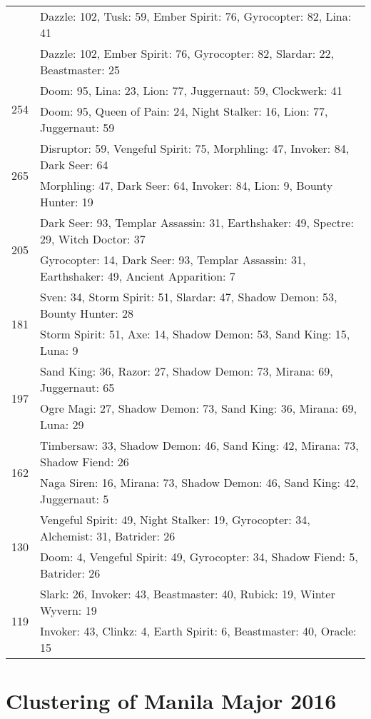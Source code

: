 \documentclass[result.tex]{subfiles}
\begin{document}
\begin{table}[H]
\begin{tabular}{ | c | p{12.5cm} | }
& Dazzle: 102, Tusk: 59, Ember Spirit: 76, Gyrocopter: 82, Lina: 41 \\
& Dazzle: 102, Ember Spirit: 76, Gyrocopter: 82, Slardar: 22, Beastmaster: 25 \\
\hline
\multirow{2}{*}{254}
& Doom: 95, Lina: 23, Lion: 77, Juggernaut: 59, Clockwerk: 41 \\
& Doom: 95, Queen of Pain: 24, Night Stalker: 16, Lion: 77, Juggernaut: 59 \\
\hline
\multirow{2}{*}{265}
& Disruptor: 59, Vengeful Spirit: 75, Morphling: 47, Invoker: 84, Dark Seer: 64 \\
& Morphling: 47, Dark Seer: 64, Invoker: 84, Lion: 9, Bounty Hunter: 19 \\
\hline
\multirow{2}{*}{205}
& Dark Seer: 93, Templar Assassin: 31, Earthshaker: 49, Spectre: 29, Witch Doctor: 37 \\
& Gyrocopter: 14, Dark Seer: 93, Templar Assassin: 31, Earthshaker: 49, Ancient Apparition: 7 \\
\hline
\multirow{2}{*}{181}
& Sven: 34, Storm Spirit: 51, Slardar: 47, Shadow Demon: 53, Bounty Hunter: 28 \\
& Storm Spirit: 51, Axe: 14, Shadow Demon: 53, Sand King: 15, Luna: 9 \\
\hline
\multirow{2}{*}{197}
& Sand King: 36, Razor: 27, Shadow Demon: 73, Mirana: 69, Juggernaut: 65 \\
& Ogre Magi: 27, Shadow Demon: 73, Sand King: 36, Mirana: 69, Luna: 29 \\
\hline
\multirow{2}{*}{162}
& Timbersaw: 33, Shadow Demon: 46, Sand King: 42, Mirana: 73, Shadow Fiend: 26 \\
& Naga Siren: 16, Mirana: 73, Shadow Demon: 46, Sand King: 42, Juggernaut: 5 \\
\hline
\multirow{2}{*}{130}
& Vengeful Spirit: 49, Night Stalker: 19, Gyrocopter: 34, Alchemist: 31, Batrider: 26 \\
& Doom: 4, Vengeful Spirit: 49, Gyrocopter: 34, Shadow Fiend: 5, Batrider: 26 \\
\hline
\multirow{2}{*}{119}
& Slark: 26, Invoker: 43, Beastmaster: 40, Rubick: 19, Winter Wyvern: 19 \\
& Invoker: 43, Clinkz: 4, Earth Spirit: 6, Beastmaster: 40, Oracle: 15 \\
\hline
    \end{tabular}
    \caption{}
    \label{}
    \end{table}

\clearpage
\section*{Clustering of Manila Major 2016}
\end{document}
